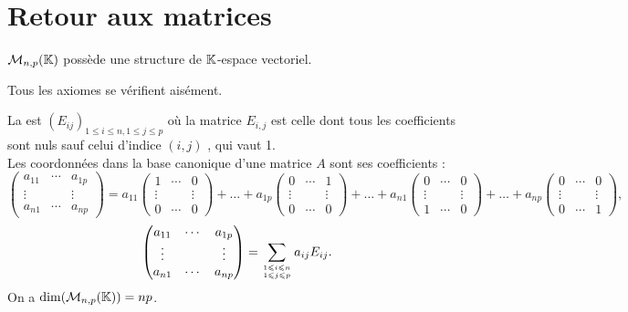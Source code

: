 \documentclass{book}
\begin{document}
\section{Retour aux matrices}
\begin{Proposition}
$\mathcal{M}_{n,p}(\mathbb{K})$ possède une structure de $\mathbb{K} $-espace vectoriel. 
\end{Proposition}
\begin{Demonstration}
Tous les axiomes se vérifient aisément.  
\end{Demonstration}
\begin{DefinitionProposition}La  est $(E_{ij})_{1\leqslant i\leqslant n, 1\leqslant j\leqslant p}$ où la matrice  $E_{i,j}$ est celle dont tous les coefficients sont nuls sauf celui d'indice $(i,j)$ , qui vaut 1.\\
 Les coordonnées dans la base canonique d'une matrice $A$ sont ses coefficients :
 $$ \begin{pmatrix}
a_{11} & \cdots & a_{1p}\\
 \vdots &  & \vdots\\
a_{n1} & \cdots & a_{np}
\end{pmatrix} =a_{11}\begin{pmatrix}
1 & \cdots & 0\\
 \vdots &  & \vdots\\
0 & \cdots & 0
\end{pmatrix}+\dots+a_{1p}\begin{pmatrix}
0 & \cdots & 1\\
 \vdots &  & \vdots\\
0 & \cdots & 0
\end{pmatrix}+ \dots+a_{n1}\begin{pmatrix}
0 & \cdots & 0\\
 \vdots &  & \vdots\\
1 & \cdots & 0
\end{pmatrix}+\dots+a_{np} \begin{pmatrix}
0 & \cdots & 0\\
 \vdots &  & \vdots\\
0 & \cdots & 1
\end{pmatrix},$$
 $$ \begin{pmatrix}
a_{11} & \cdots & a_{1p}\\
 \vdots &  & \vdots\\
a_{n1} & \cdots & a_{np}
\end{pmatrix} =  \sum _{1\leqslant i\leqslant n\atop 1\leqslant j\leqslant p}  a_{ij} E_{ij}.$$
On a $\dim( \mathcal{M}_{n,p}(\mathbb{K}))=np$.
\end{DefinitionProposition}
\end{document}
